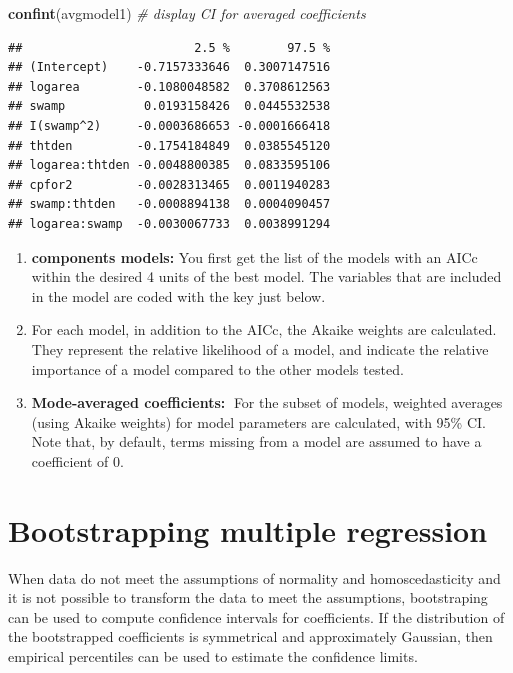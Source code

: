 \documentclass[
  12pt,
]{book}
\newenvironment{Shaded}{\begin{snugshade}}{\end{snugshade}}
\newcommand{\CommentTok}[1]{\textcolor[rgb]{0.56,0.35,0.01}{\textit{#1}}}
\newcommand{\KeywordTok}[1]{\textcolor[rgb]{0.13,0.29,0.53}{\textbf{#1}}}
\newcommand{\NormalTok}[1]{#1}
\providecommand{\tightlist}{%
  \setlength{\itemsep}{0pt}\setlength{\parskip}{0pt}}
\begin{document}
\begin{Shaded}
\begin{Highlighting}[]
\KeywordTok{confint}\NormalTok{(avgmodel1) }\CommentTok{\# display CI for averaged coefficients}
\end{Highlighting}
\end{Shaded}

\begin{verbatim}
##                        2.5 %        97.5 %
## (Intercept)    -0.7157333646  0.3007147516
## logarea        -0.1080048582  0.3708612563
## swamp           0.0193158426  0.0445532538
## I(swamp^2)     -0.0003686653 -0.0001666418
## thtden         -0.1754184849  0.0385545120
## logarea:thtden -0.0048800385  0.0833595106
## cpfor2         -0.0028313465  0.0011940283
## swamp:thtden   -0.0008894138  0.0004090457
## logarea:swamp  -0.0030067733  0.0038991294
\end{verbatim}

\begin{enumerate}
\def\labelenumi{\arabic{enumi}.}
\tightlist
\item
  \textbf{components models:} You first get the list of the models with an AICc within the desired 4 units of the best model. The variables that are included in the model are coded with the key just below.
\item
  For each model, in addition to the AICc, the Akaike weights are calculated. They represent the relative likelihood of a model, and indicate the relative importance of a model compared to the other models tested.
\item
  \textbf{Mode-averaged coefficients:} For the subset of models, weighted averages (using Akaike weights) for model parameters are calculated, with 95\% CI. Note that, by default, terms missing from a model are assumed to have a
  coefficient of 0.
\end{enumerate}

\hypertarget{bootstrapping-multiple-regression}{%
\section{Bootstrapping multiple regression}\label{bootstrapping-multiple-regression}}

When data do not meet the assumptions of normality and homoscedasticity and it is not possible to transform the data to meet the assumptions, bootstraping can be used to compute confidence intervals for coefficients. If the distribution of the bootstrapped coefficients is symmetrical and approximately Gaussian, then empirical percentiles can be used to estimate the confidence limits.
\end{document}
